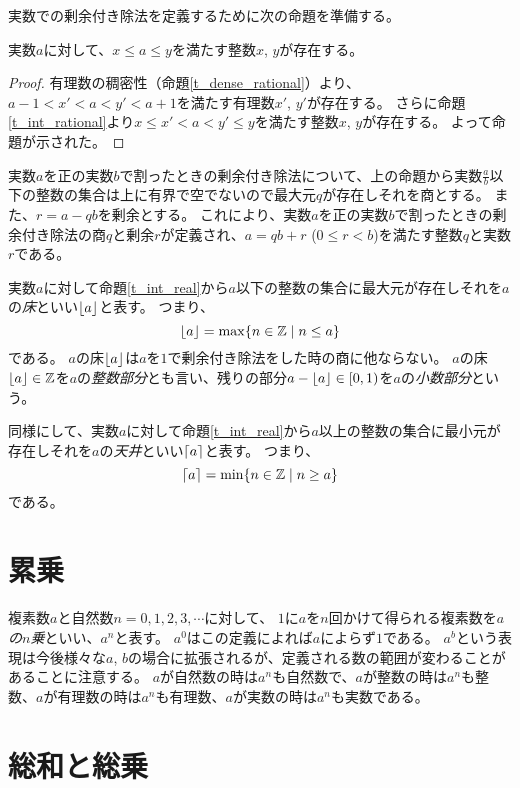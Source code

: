 実数での剰余付き除法を定義するために次の命題を準備する。

\begin{proposition}
\label{t_int_real}
実数$a$に対して、$x \le a \le y$を満たす整数$x$, $y$が存在する。
\end{proposition}

\begin{proof}
有理数の稠密性（命題\ref{t_dense_rational}）より、$a-1 < x' < a < y' < a+1$を満たす有理数$x'$, $y'$が存在する。
さらに命題\ref{t_int_rational}より$x \le x' < a < y' \le y$を満たす整数$x$, $y$が存在する。
よって命題が示された。
\end{proof}

実数$a$を正の実数$b$で割ったときの剰余付き除法について、上の命題から実数$\frac{a}{b}$以下の整数の集合は上に有界で空でないので最大元$q$が存在しそれを商とする。
また、$r = a-q b$を剰余とする。
これにより、実数$a$を正の実数$b$で割ったときの剰余付き除法の商$q$と剰余$r$が定義され、$a = q b+r$ ($0 \le r < b$)を満たす整数$q$と実数$r$である。

実数$a$に対して命題\ref{t_int_real}から$a$以下の整数の集合に最大元が存在しそれを$a$の\emph{床}といい$\lfloor a\rfloor$と表す。
つまり、
$$
\lfloor a\rfloor = \max\{ n \in \mathbb{Z} \mid n \le a \}
$$
である。
$a$の床$\lfloor a\rfloor$は$a$を$1$で剰余付き除法をした時の商に他ならない。
$a$の床$\lfloor a\rfloor \in \mathbb{Z}$を$a$の\emph{整数部分}とも言い、残りの部分$a-\lfloor a\rfloor \in [0, 1)$を$a$の\emph{小数部分}という。

同様にして、実数$a$に対して命題\ref{t_int_real}から$a$以上の整数の集合に最小元が存在しそれを$a$の\emph{天井}といい$\lceil a\rceil$と表す。
つまり、
$$
\lceil a\rceil = \min\{ n \in \mathbb{Z} \mid n \ge a \}
$$
である。

\section{累乗}

複素数$a$と自然数$n = 0, 1, 2, 3, \cdots$に対して、
$1$に$a$を$n$回かけて得られる複素数を\emph{$a$の$n$乗}といい、$a^n$と表す。
$a^0$はこの定義によれば$a$によらず$1$である。
$a^b$という表現は今後様々な$a$, $b$の場合に拡張されるが、定義される数の範囲が変わることがあることに注意する。
$a$が自然数の時は$a^n$も自然数で、$a$が整数の時は$a^n$も整数、$a$が有理数の時は$a^n$も有理数、$a$が実数の時は$a^n$も実数である。

\section{総和と総乗}

